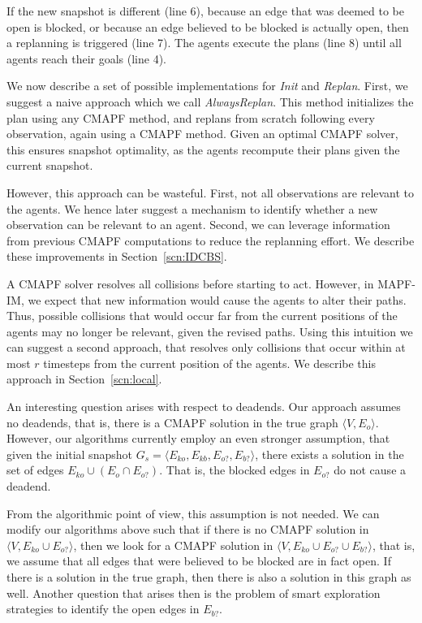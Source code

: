 \documentclass[letterpaper]{article} %
\def\
UrlFont{\rm}  %
\newcommand{\eko}{E_{ko}} %
\newcommand{\ekb}{E_{kb}} %
\newcommand{\eao}{E_{o?}} %
\newcommand{\eab}{E_{b?}} %
\theoremstyle{definition}
\begin{document}
If the new snapshot is different (line 6), because an edge that was deemed to be open is blocked, or because an edge believed to be blocked is actually open, then a replanning is triggered (line 7).
The agents execute the plans (line 8) until all agents reach their goals (line 4).

We now describe a set of possible implementations for {\em Init} and {\em Replan}. First, we suggest a naive approach which we call {\em AlwaysReplan}. This method initializes the plan using any CMAPF method, and replans from scratch following every observation, again using a CMAPF method. Given an optimal CMAPF solver, this ensures snapshot optimality, as the agents recompute their plans given the current snapshot.


However, this approach can be  wasteful. First, not all observations are relevant to the agents. We hence later suggest a mechanism to identify whether a new observation can be relevant to an agent. Second, we can leverage information from previous CMAPF computations to reduce the replanning effort. We describe these improvements in Section~\ref{scn:IDCBS}.

A CMAPF solver resolves all collisions before starting to act. However, in MAPF-IM, we expect that new information would cause the agents to alter their paths. Thus, possible collisions that would occur far from the current positions of the agents may no longer be relevant, given the revised paths. Using this intuition we can suggest a second approach, that resolves only collisions that occur within at most $r$ timesteps from the current position of the agents. We describe this approach in Section~\ref{scn:local}. 


An interesting question arises with respect to deadends. Our approach assumes no deadends, that is, there is a CMAPF solution in the true graph $\langle V, E_o \rangle$. However, our algorithms currently employ an even stronger assumption, that given the initial snapshot $G_s=\langle \eko, \ekb, \eao, \eab \rangle$, there exists a solution in the set of edges $\eko \cup (E_o \cap \eao)$. That is, the blocked edges in $\eao$ do not cause a deadend. 

From the algorithmic point of view, this assumption is not needed. 
We can modify our algorithms above such that if there is no CMAPF solution in $\langle V, \eko \cup \eao \rangle$, then we look for a CMAPF solution in $\langle V, \eko \cup \eao \cup \eab \rangle $, that is, we assume that all edges that were believed to be blocked are in fact open. If there is a solution in the true graph, then there is also a solution in this graph as well. Another question that arises then is the problem of smart exploration strategies to identify the open edges in $\eab$.
\end{document}
